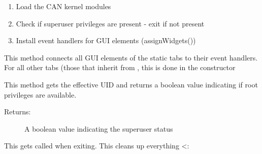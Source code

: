 \documentclass[letterpaper,10pt,english]{sphinxmanual}
\begin{document}
\begin{fulllineitems}
\begin{fulllineitems}
\begin{description}
\begin{enumerate}
\item {} 
Load the CAN kernel modules

\item {} 
Check if superuser privileges are present - exit if not present

\item {} 
Install event handlers for GUI elements (assignWidgets())

\end{enumerate}

\end{description}

\end{fulllineitems}


\begin{fulllineitems}
\label{\detokenize{src:src.CANalyzat0r.MainWindow.assignWidgets}}
This method connects all GUI elements of the static tabs to their event handlers.
For all other tabs (those that inherit from {\hyperref[\detokenize{src:src.AbstractTab.AbstractTab}]{}}, this is
done in the constructor

\end{fulllineitems}


\begin{fulllineitems}
\label{\detokenize{src:src.CANalyzat0r.MainWindow.checkSU}}
This method gets the effective UID and returns a
boolean value indicating if root privileges are available.
\begin{description}
\item[{Returns:}] \leavevmode
A boolean value indicating the superuser status

\end{description}

\end{fulllineitems}


\begin{fulllineitems}
\label{\detokenize{src:src.CANalyzat0r.MainWindow.cleanup}}
This gets called when exiting.
This cleans up everything \textless{}:


\end{fulllineitems}
\end{fulllineitems}
\end{document}
